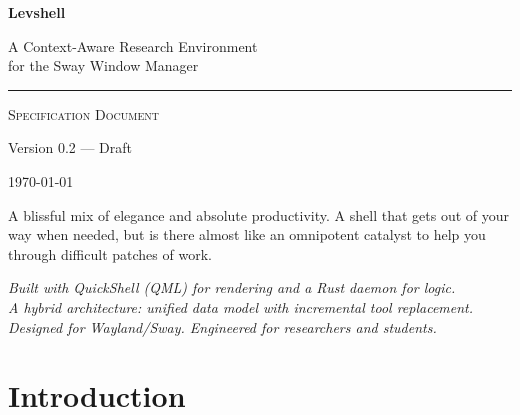 \documentclass[11pt,a4paper]{article}
\begin{document}
\begin{titlepage}
\centering
\vspace*{2cm}

{\Huge\bfseries\color{NavyBlue} Levshell\par}
\vspace{0.5cm}
{\Large\color{NavyBlue!70} A Context-Aware Research Environment\\for the Sway Window Manager\par}

\vspace{1cm}
\textcolor{levblue}{\rule{0.6\textwidth}{1pt}}

\vspace{1.5cm}
{\large\textsc{Specification Document}\par}
\vspace{0.3cm}
{\normalsize Version 0.2 --- Draft\par}
\vspace{0.3cm}
{\normalsize\today\par}

\vspace{3cm}

\begin{principlebox}
A blissful mix of elegance and absolute productivity. A shell that gets out of your way when needed, but is there almost like an omnipotent catalyst to help you through difficult patches of work.
\end{principlebox}

\vspace{2cm}

{\small\textit{Built with QuickShell (QML) for rendering and a Rust daemon for logic.\\A hybrid architecture: unified data model with incremental tool replacement.\\Designed for Wayland/Sway. Engineered for researchers and students.}\par}

\vfill
\end{titlepage}

\newpage
\tableofcontents
\newpage


\section{Introduction}
\label{sec:intro}
\end{document}
